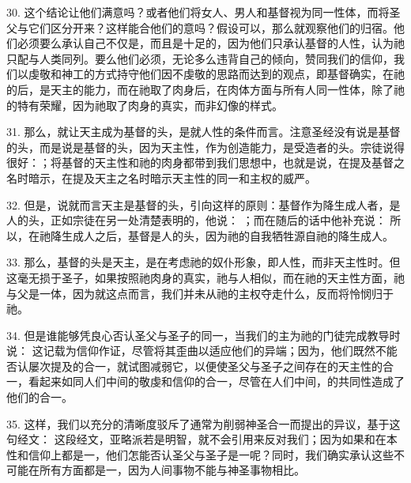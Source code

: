 30. 这个结论让他们满意吗？或者他们将女人、男人和基督视为同一性体，而将圣父与它们区分开来？这样能合他们的意吗？假设可以，那么就观察他们的归宿。他们必须要么承认自己不仅是，而且是十足的，因为他们只承认基督的人性，认为祂只配与人类同列。要么他们必须，无论多么违背自己的倾向，赞同我们的信仰，我们以虔敬和神工的方式持守他们因不虔敬的思路而达到的观点，即基督确实，在祂的后，是天主的能力，而在祂取了肉身后，在肉体方面与所有人同一性体，除了祂的特有荣耀，因为祂取了肉身的真实，而非幻像的样式。\par

31. 那么，就让天主成为基督的头，是就人性的条件而言。注意圣经没有说是基督的头，而是说是基督的头，因为天主性，作为创造能力，是受造者的头。宗徒说得很好：；将基督的天主性和祂的肉身都带到我们思想中，也就是说，在提及基督之名时暗示，在提及天主之名时暗示天主性的同一和主权的威严。\par

32. 但是，说就而言天主是基督的头，引向这样的原则：基督作为降生成人者，是人的头，正如宗徒在另一处清楚表明的，他说： ；而在随后的话中他补充说：  所以，在祂降生成人之后，基督是人的头，因为祂的自我牺牲源自祂的降生成人。\par

33. 那么，基督的头是天主，是在考虑祂的奴仆形象，即人性，而非天主性时。但这毫无损于圣子，如果按照祂肉身的真实，祂与人相似，而在祂的天主性方面，祂与父是一体，因为就这点而言，我们并未从祂的主权夺走什么，反而将怜悯归于祂。\par

34. 但是谁能够凭良心否认圣父与圣子的同一，当我们的主为祂的门徒完成教导时说：  这记载为信仰作证，尽管将其歪曲以适应他们的异端；因为，他们既然不能否认屡次提及的合一，就试图减弱它，以便使圣父与圣子之间存在的天主性的合一，看起来如同人们中间的敬虔和信仰的合一，尽管在人们中间，的共同性造成了他们的合一。\par

35. 这样，我们以充分的清晰度驳斥了通常为削弱神圣合一而提出的异议，基于这句经文： 这段经文，亚略派若是明智，就不会引用来反对我们；因为如果和在本性和信仰上都是一，他们怎能否认圣父与圣子是一呢？同时，我们确实承认这些不可能在所有方面都是一，因为人间事物不能与神圣事物相比。\par

